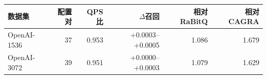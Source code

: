 \begin{tabular}{@{}lrrrrr@{}}
\toprule
数据集 & 配置对 & QPS 比 & $\Delta$召回 & 相对 RaBitQ & 相对 CAGRA \\
\midrule
OpenAI-1536 & 37 & 0.953 & +0.0003--+0.0005 & 1.086 & 1.679 \\
OpenAI-3072 & 39 & 0.951 & +0.0000--+0.0003 & 1.079 & 1.629 \\
\bottomrule
\end{tabular}
